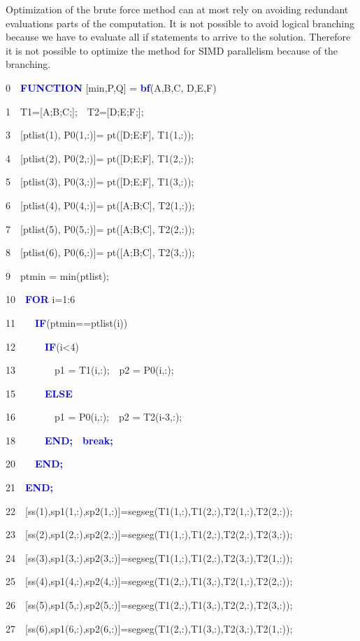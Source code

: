 \documentclass[times,12pt]{article}
\begin{document}
Optimization of the brute force method can at most rely on avoiding redundant evaluations parts of the computation. It is not possible to avoid logical branching because we have to evaluate all if statements to arrive to the solution. Therefore it is not possible to optimize the method for SIMD parallelism because of the branching. 

\begin{algorithm}
0~~\textbf{\textcolor{blue}{FUNCTION}} [min,P,Q] = \textbf{\textcolor{blue}{bf}}(A,B,C, D,E,F)

1~~T1=[A;B;C;];~~T2=[D;E;F;];

3~~[ptlist(1), P0(1,:)]= pt([D;E;F], T1(1,:));

4~~[ptlist(2), P0(2,:)]= pt([D;E;F], T1(2,:));

5~~[ptlist(3), P0(3,:)]= pt([D;E;F], T1(3,:));

6~~[ptlist(4), P0(4,:)]= pt([A;B;C], T2(1,:));

7~~[ptlist(5), P0(5,:)]= pt([A;B;C], T2(2,:));

8~~[ptlist(6), P0(6,:)]= pt([A;B;C], T2(3,:));

9~~ptmin = min(ptlist);

10~~\textbf{\textcolor{blue}{FOR}} i=1:6

11~~~~\textbf{\textcolor{blue}{IF}}(ptmin==ptlist(i))

12~~~~~~\textbf{\textcolor{blue}{IF}}(i<4)

13~~~~~~~~p1 = T1(i,:);~~p2 = P0(i,:);

15~~~~~~\textbf{\textcolor{blue}{ELSE}}

16~~~~~~~~p1 = P0(i,:);~~p2 = T2(i-3,:);

18~~~~~~\textbf{\textcolor{blue}{END;}}~~\textbf{\textcolor{blue}{break;}}

20~~~~\textbf{\textcolor{blue}{END;}}

21~~\textbf{\textcolor{blue}{END;}}

22~~[ss(1),sp1(1,:),sp2(1,:)]=segseg(T1(1,:),T1(2,:),T2(1,:),T2(2,:));

23~~[ss(2),sp1(2,:),sp2(2,:)]=segseg(T1(1,:),T1(2,:),T2(2,:),T2(3,:));

24~~[ss(3),sp1(3,:),sp2(3,:)]=segseg(T1(1,:),T1(2,:),T2(3,:),T2(1,:));

25~~[ss(4),sp1(4,:),sp2(4,:)]=segseg(T1(2,:),T1(3,:),T2(1,:),T2(2,:));

26~~[ss(5),sp1(5,:),sp2(5,:)]=segseg(T1(2,:),T1(3,:),T2(2,:),T2(3,:));

27~~[ss(6),sp1(6,:),sp2(6,:)]=segseg(T1(2,:),T1(3,:),T2(3,:),T2(1,:));


\end{algorithm}
\end{document}
